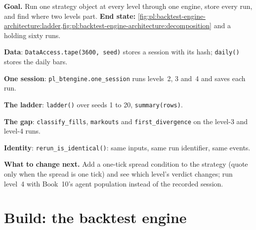 \begin{tutorial}
\textbf{Goal.} Run one strategy object at every level through one engine, store every run, and find where two levels part.
\textbf{End state:} \cref{fig:pl:backtest-engine-architecture:ladder,fig:pl:backtest-engine-architecture:decomposition} and a  holding sixty runs.
\begin{tutsteps}
\item \textbf{Data}: \texttt{DataAccess.tape(3600, seed)} stores a session with its hash; \texttt{daily()} stores the daily bars.
\item \textbf{One session}: \texttt{pl\_btengine.one\_session} runs levels~2, 3 and~4 and saves each run.
\item \textbf{The ladder}: \texttt{ladder()} over seeds 1 to 20, \texttt{summary(rows)}.
\item \textbf{The gap}: \texttt{classify\_fills}, \texttt{markouts} and \texttt{first\_divergence} on the level-3 and level-4 runs.
\item \textbf{Identity}: \texttt{rerun\_is\_identical()}: same inputs, same run identifier, same events.
\end{tutsteps}
\textbf{What to change next.} Add a one-tick spread condition to the strategy (quote only when the spread is one tick) and see which
level's verdict changes; run level~4 with Book~10's agent population instead of the recorded session.
\end{tutorial}

\section{Build: the backtest engine}\label{bld:pl:backtest-engine-architecture:btengine}

